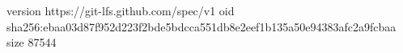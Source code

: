 version https://git-lfs.github.com/spec/v1
oid sha256:ebaa03d87f952d223f2bde5bdcca551db8e2eef1b135a50e94383afc2a9fcbaa
size 87544

